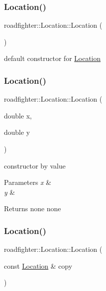 \subsubsection{\texorpdfstring{Location()}{Location()}\hspace{0.1cm}{\footnotesize\ttfamily [1/4]}}
{\footnotesize\ttfamily roadfighter\+::\+Location\+::\+Location (\begin{DoxyParamCaption}{ }\end{DoxyParamCaption})\hspace{0.3cm}{\ttfamily [default]}}

default constructor for \hyperlink{classroadfighter_1_1Location}{Location} \mbox{\label{classroadfighter_1_1Location_a4c8cbcc76ddad6145cf0930c7840abc2}} 
\subsubsection{\texorpdfstring{Location()}{Location()}\hspace{0.1cm}{\footnotesize\ttfamily [2/4]}}
{\footnotesize\ttfamily roadfighter\+::\+Location\+::\+Location (\begin{DoxyParamCaption}\item[{double}]{x,  }\item[{double}]{y }\end{DoxyParamCaption})}

constructor by value 
\begin{DoxyParams}{Parameters}
{\em x} & \\
\hline
{\em y} & \\
\hline
\end{DoxyParams}
\begin{DoxyReturn}{Returns}
none  none 
\end{DoxyReturn}
\mbox{\label{classroadfighter_1_1Location_ac3e3afdb0b4c32abdd92d771d1ddf2be}} 
\subsubsection{\texorpdfstring{Location()}{Location()}\hspace{0.1cm}{\footnotesize\ttfamily [3/4]}}
{\footnotesize\ttfamily roadfighter\+::\+Location\+::\+Location (\begin{DoxyParamCaption}\item[{const \hyperlink{classroadfighter_1_1Location}{Location} \&}]{copy }\end{DoxyParamCaption})\hspace{0.3cm}{\ttfamily [default]}}


